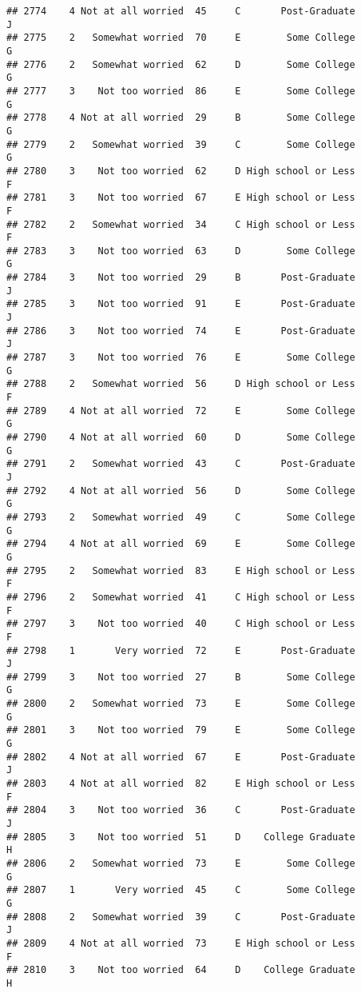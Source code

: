 \documentclass[
]{article}
\begin{document}
\begin{verbatim}
## 2774    4 Not at all worried  45     C       Post-Graduate         J
## 2775    2   Somewhat worried  70     E        Some College         G
## 2776    2   Somewhat worried  62     D        Some College         G
## 2777    3    Not too worried  86     E        Some College         G
## 2778    4 Not at all worried  29     B        Some College         G
## 2779    2   Somewhat worried  39     C        Some College         G
## 2780    3    Not too worried  62     D High school or Less         F
## 2781    3    Not too worried  67     E High school or Less         F
## 2782    2   Somewhat worried  34     C High school or Less         F
## 2783    3    Not too worried  63     D        Some College         G
## 2784    3    Not too worried  29     B       Post-Graduate         J
## 2785    3    Not too worried  91     E       Post-Graduate         J
## 2786    3    Not too worried  74     E       Post-Graduate         J
## 2787    3    Not too worried  76     E        Some College         G
## 2788    2   Somewhat worried  56     D High school or Less         F
## 2789    4 Not at all worried  72     E        Some College         G
## 2790    4 Not at all worried  60     D        Some College         G
## 2791    2   Somewhat worried  43     C       Post-Graduate         J
## 2792    4 Not at all worried  56     D        Some College         G
## 2793    2   Somewhat worried  49     C        Some College         G
## 2794    4 Not at all worried  69     E        Some College         G
## 2795    2   Somewhat worried  83     E High school or Less         F
## 2796    2   Somewhat worried  41     C High school or Less         F
## 2797    3    Not too worried  40     C High school or Less         F
## 2798    1       Very worried  72     E       Post-Graduate         J
## 2799    3    Not too worried  27     B        Some College         G
## 2800    2   Somewhat worried  73     E        Some College         G
## 2801    3    Not too worried  79     E        Some College         G
## 2802    4 Not at all worried  67     E       Post-Graduate         J
## 2803    4 Not at all worried  82     E High school or Less         F
## 2804    3    Not too worried  36     C       Post-Graduate         J
## 2805    3    Not too worried  51     D    College Graduate         H
## 2806    2   Somewhat worried  73     E        Some College         G
## 2807    1       Very worried  45     C        Some College         G
## 2808    2   Somewhat worried  39     C       Post-Graduate         J
## 2809    4 Not at all worried  73     E High school or Less         F
## 2810    3    Not too worried  64     D    College Graduate         H

\end{verbatim}
\end{document}
